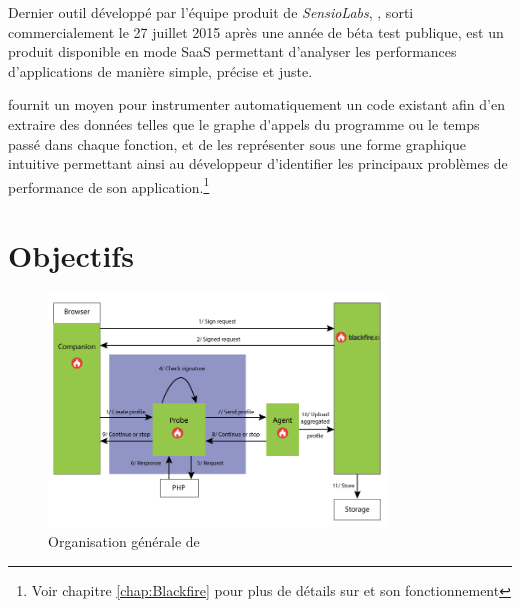 Dernier outil développé par l'équipe produit de \emph{SensioLabs}, \Blackfire,
sorti commercialement le 27 juillet 2015 après une année de béta test publique, est un produit disponible en mode \gls{SaaS} permettant d'analyser les performances d'applications \PHP de manière simple, précise et juste.

\Blackfire fournit un moyen pour instrumenter automatiquement un code \PHP existant afin d'en extraire des données telles que le \gls{graphe d'appels} du programme ou le temps passé dans chaque fonction, et de les représenter sous une forme graphique intuitive permettant ainsi au développeur d'identifier les principaux problèmes de performance de son application.\footnote{Voir chapitre \vref{chap:Blackfire} pour plus de détails sur \Blackfire et son fonctionnement}


\chapter{Objectifs}
	\setcounter{chapter}{2}
	
\begin{figure}[!h]
\begin{center}
  \includegraphics[width=0.8\textwidth]{images/schemas/workflow/general-workflow}
  \caption{Organisation générale de \Blackfire}
\end{center}
\end{figure}

